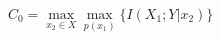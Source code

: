 \documentclass[preview]{standalone}
\begin{document}
\begin{center}
$C_0 = \underset{x_2 \in X}{\max} \underset{p(x_1)}{\max} \{I(X_1;Y|x_2)\}$
\end{center}
\end{document}
